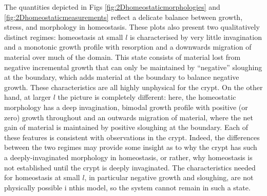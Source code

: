 The quantities depicted in Figs \ref{fig:2Dhomeostaticmorphologies} and \ref{fig:2Dhomeostaticmeasurements} reflect a delicate balance between growth, stress, and morphology in homeostasis. These plots also present two qualitatively distinct regimes: homeostasis at small $l$ is characterised by very little invagination and a monotonic growth profile with resorption and a downwards migration of material over much of the domain. This state consists of material lost from negative incremental growth that can only be maintained by ``negative'' sloughing at the boundary, which adds material at the boundary to balance negative growth. These characteristics are all highly unphysical for the crypt. On the other hand, at larger $l$ the picture is completely different: here, the homeostatic morphology has a deep invagination, bimodal growth profile with positive (or zero) growth throughout and an outwards migration of material, where the net gain of material is maintained by positive sloughing at the boundary. Each of these features is consistent with observations in the crypt. Indeed, the differences between the two regimes may provide some insight as to why the crypt has such a deeply-invaginated morphology in homeostasis, or rather, why homeostasis is not established until the crypt is deeply invaginated. The characteristics needed for homeostasis at small $l$, in particular negative growth and sloughing, are not physically possible i nthis model, so the system cannot remain in such a state. 

%
%

